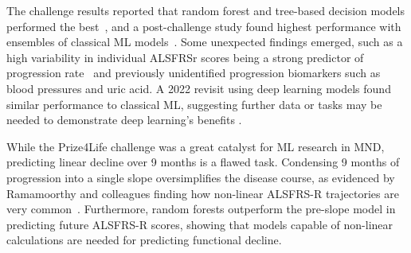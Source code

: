 The challenge results reported that random forest and tree-based decision models performed the best~\cite{kuffnerCrowdsourcedAnalysisClinical2015}, and a post-challenge study found highest performance with ensembles of classical ML models~\cite{turabiehMachineLearningEmpowered2024}.
Some unexpected findings emerged, such as a high variability in individual ALSFRSr scores being a strong predictor of progression rate~\cite{hothornRandomForest4LifeRandomForest2014} and previously unidentified progression biomarkers such as blood pressures and uric acid.
A 2022 revisit using deep learning models found similar performance to classical ML, suggesting further data or tasks may be needed to demonstrate deep learning's benefits \cite{pancottiDeepLearningMethods2022}.

While the Prize4Life challenge was a great catalyst for ML research in MND, predicting linear decline over 9 months is a flawed task.
Condensing 9 months of progression into a single slope oversimplifies the disease course, as evidenced by Ramamoorthy and colleagues finding how non-linear ALSFRS-R trajectories are very common~\cite{ramamoorthyIdentifyingPatternsAmyotrophic2022}.
Furthermore, random forests outperform the pre-slope model in predicting future ALSFRS-R scores, showing that models capable of non-linear calculations are needed for predicting functional decline.


